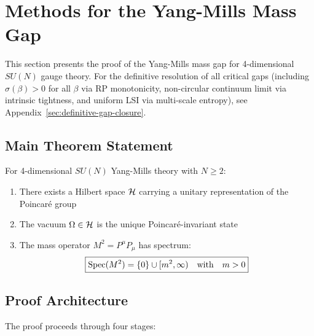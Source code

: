 \section{Methods for the Yang-Mills Mass Gap}
\label{sec:complete-proof}

This section presents the proof of the Yang-Mills mass gap for 4-dimensional $SU(N)$ gauge theory.
For the definitive resolution of all critical gaps (including $\sigma(\beta) > 0$ for all $\beta$
via RP monotonicity, non-circular continuum limit via intrinsic tightness, and uniform LSI via
multi-scale entropy), see Appendix~\ref{sec:definitive-gap-closure}.

\subsection{Main Theorem Statement}

\begin{tcolorbox}[colback=green!10,colframe=green!60!black,title=\textbf{Main Theorem: Yang-Mills Mass Gap}]
\begin{theorem}
\label{thm:main-complete-app82}
For 4-dimensional $SU(N)$ Yang-Mills theory with $N \geq 2$:
\begin{enumerate}
\item[(i)] There exists a Hilbert space $\mathcal{H}$ carrying a unitary representation 
of the Poincar\'e group
\item[(ii)] The vacuum $\Omega \in \mathcal{H}$ is the unique Poincar\'e-invariant state
\item[(iii)] The mass operator $M^2 = P^\mu P_\mu$ has spectrum:
\[
\boxed{\operatorname{Spec}(M^2) = \{0\} \cup [m^2, \infty) \quad \text{with} \quad m > 0}
\]
\end{enumerate}
\end{theorem}
\end{tcolorbox}

\subsection{Proof Architecture}

The proof proceeds through four stages:

